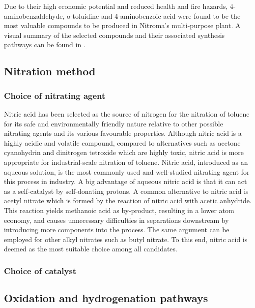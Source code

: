 Due to their high economic potential and reduced health and fire hazards, 4-aminobenzaldehyde, o-toluidine and 4-aminobenzoic acid were found to be the most valuable compounds to be produced in Nitroma's multi-purpose plant.  A visual summary of the selected compounds and their associated synthesis pathways can be found in .



\subsection{Nitration method}
\subsubsection{Choice of nitrating agent}
\noindent Nitric acid has been selected as the source of nitrogen for the nitration of toluene for its safe and environmentally friendly nature relative to other possible nitrating agents and its various favourable properties. \cite{miller_kinetics_1964, sreedhar_scientific_2013} Although nitric acid is a highly acidic and volatile compound, compared to alternatives such as acetone cyanohydrin and dinitrogen tetroxide which are highly toxic, nitric acid is more appropriate for industrial-scale nitration of toluene. \cite{dagade_nitration_2002, sreedhar_scientific_2013} Nitric acid, introduced as an aqueous solution, is the most commonly used and well-studied nitrating agent for this process in industry. \cite{bowers_toluidines_2000} A big advantage of aqueous nitric acid is that it can act as a self-catalyst by self-donating protons. \cite{miller_kinetics_1964} A common alternative to nitric acid is acetyl nitrate which is formed by the reaction of nitric acid with acetic anhydride. \cite{vassena_selective_1999} This reaction yields methanoic acid as by-product, resulting in a lower atom economy, and causes unnecessary difficulties in separations downstream by introducing more components into the process. The same argument can be employed for other alkyl nitrates such as butyl nitrate. To this end, nitric acid is deemed as the most suitable choice among all candidates.


\subsubsection{Choice of catalyst}

\subsection{Oxidation and hydrogenation pathways}
